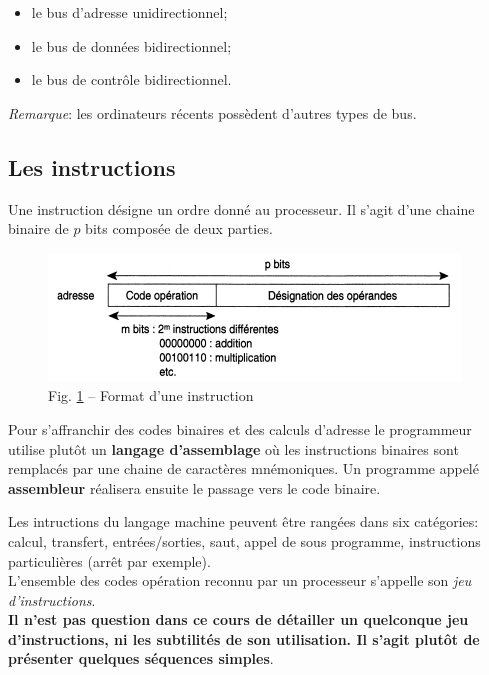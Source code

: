 \documentclass[11pt,french]{article}
\makeatletter
\def\maxwidth{\ifdim\Gin@nat@width>\linewidth\linewidth
    \else\Gin@nat@width\fi}
\let\Oldincludegraphics\includegraphics
\renewcommand{\includegraphics}[1]{\Oldincludegraphics[width=.8\maxwidth]{#1}}
\providecommand{\tightlist}{%
      \setlength{\itemsep}{0pt}\setlength{\parskip}{0pt}}
\makeatother
\begin{document}
\begin{itemize}
\tightlist
\item
  le bus d'adresse unidirectionnel;
\item
  le bus de données bidirectionnel;
\item
  le bus de contrôle bidirectionnel.
\end{itemize}

\emph{Remarque}: les ordinateurs récents possèdent d'autres types de
bus.

\hypertarget{les-instructions}{%
\subsection{Les instructions}\label{les-instructions}}

Une instruction désigne un ordre donné au processeur. Il s'agit d'une
chaine binaire de \(p\) bits composée de deux parties.
\begin{figure}[h]
	\begin{center}
		\includegraphics{../img/as_instruction.jpg} 
	\end{center}
	\caption{Fig. \ref{fig:les-instructions} -- Format d'une instruction}
	\label{fig:les-instructions}
\end{figure}

Pour s'affranchir des codes
binaires et des calculs d'adresse le programmeur utilise plutôt un
\textbf{langage d'assemblage} où les instructions binaires sont
remplacés par une chaine de caractères mnémoniques. Un programme appelé
\textbf{assembleur} réalisera ensuite le passage vers le code binaire.\par
Les intructions du langage machine peuvent être rangées dans six
catégories: calcul, transfert, entrées/sorties, saut, appel de sous
programme, instructions particulières (arrêt par exemple).\\
L'ensemble des codes opération reconnu par un processeur s'appelle son
\emph{jeu d'instructions}.\\ 

\textbf{Il n'est pas question dans ce cours de
détailler un quelconque jeu d'instructions, ni les subtilités de son
utilisation. Il s'agit plutôt de présenter quelques séquences simples}.\\
\end{document}
